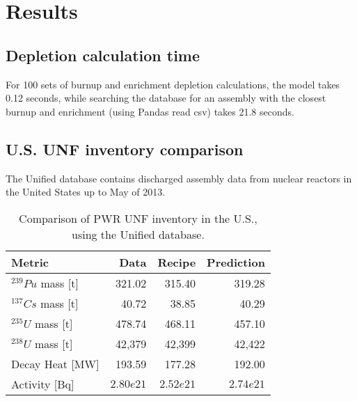 \section{Results}


\subsection{Depletion calculation time}

For 100 sets of
burnup and enrichment depletion calculations,
the model takes 0.12 seconds, while
searching the database for an assembly
with the closest burnup and enrichment (using Pandas read csv)
takes 21.8 seconds.

\subsection{U.S. \gls{UNF} inventory comparison}


The Unified database contains discharged assembly data
from nuclear reactors in the United States up to May of
2013. 


\begin{table}[h]
    \centering
    \begin{tabular}{lrrr}
        \hline
        Metric & Data & Recipe & Prediction \\
        \hline
        $^{239}Pu$ mass [t] & 321.02 & 315.40 & 319.28\\
        $^{137}Cs$ mass [t] & 40.72 & 38.85 & 40.29 \\
        $^{235}U$ mass [t] & 478.74 & 468.11 & 457.10\\
        $^{238}U$ mass [t] & 42,379 & 42,399 & 42,422\\
        Decay Heat [MW] & 193.59 & 177.28 & 192.00 \\
        Activity [Bq] & $2.80e21$ & $2.52e21$ & $2.74e21$ \\
        \hline
    \end{tabular}
    \caption{Comparison of \gls{PWR} \gls{UNF} inventory in the U.S.,
             using the Unified database.}
\end{table}


